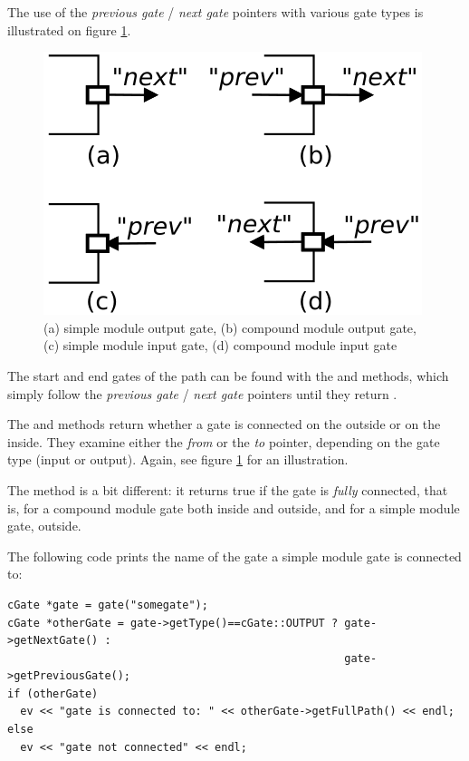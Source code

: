 The use of the \textit{previous gate} / \textit{next gate} pointers
with various gate types is illustrated on figure
\ref{fig:ch-simple-modules:gates}.

\begin{figure}[htbp]
\begin{center}
\includegraphics{figures/gates}
\caption{(a) simple module output gate, (b) compound module output gate,
         (c) simple module input gate, (d) compound module input gate}
\label{fig:ch-simple-modules:gates}
\end{center}
\end{figure}

The start and end gates of the path can be found with the 
and  methods, which simply follow the \textit{previous gate} /
\textit{next gate} pointers until they return .

The  and  methods
return whether a gate is connected on the outside or on the inside. They
examine either the \textit{from} or the \textit{to} pointer, depending on the
gate type (input or output). Again, see figure \ref{fig:ch-simple-modules:gates}
for an illustration.

The  method is a bit different: it returns true if the gate
is \textit{fully} connected, that is, for a compound module gate
both inside and outside, and for a simple module gate, outside.

The following code prints the name of the gate a simple module gate is
connected to:

\begin{verbatim}
cGate *gate = gate("somegate");
cGate *otherGate = gate->getType()==cGate::OUTPUT ? gate->getNextGate() :
                                                    gate->getPreviousGate();
if (otherGate)
  ev << "gate is connected to: " << otherGate->getFullPath() << endl;
else
  ev << "gate not connected" << endl;
\end{verbatim}



